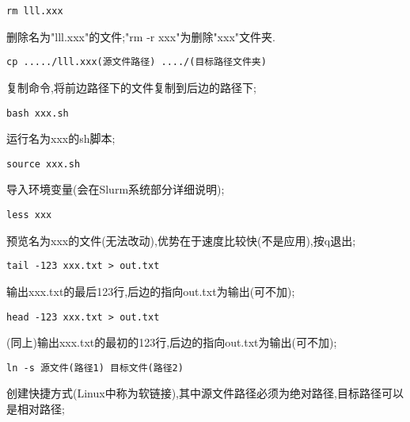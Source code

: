 \begin{lstlisting}[frame=single]
rm lll.xxx
\end{lstlisting}
\par
删除名为"lll.xxx"的文件;"rm -r xxx"为删除"xxx"文件夹.\par

\begin{lstlisting}[frame=single]
cp ...../lll.xxx(源文件路径) ..../(目标路径文件夹)
\end{lstlisting}
\par
复制命令,将前边路径下的文件复制到后边的路径下;\par

\begin{lstlisting}[frame=single]
bash xxx.sh
\end{lstlisting}
\par
运行名为xxx的sh脚本;

\begin{lstlisting}[frame=single]
source xxx.sh
\end{lstlisting}
\par
导入环境变量(会在Slurm系统部分详细说明);\par


\begin{lstlisting}[frame=single]
less xxx
\end{lstlisting}
\par
预览名为xxx的文件(无法改动),优势在于速度比较快(不是应用),按q退出;\par


\begin{lstlisting}[frame=single]
tail -123 xxx.txt > out.txt
\end{lstlisting}
\par
输出xxx.txt的最后123行,后边的指向out.txt为输出(可不加);\par

\begin{lstlisting}[frame=single]
head -123 xxx.txt > out.txt
\end{lstlisting}
\par
(同上)输出xxx.txt的最初的123行,后边的指向out.txt为输出(可不加);\par

\begin{lstlisting}[frame=single]
ln -s 源文件(路径1) 目标文件(路径2)
\end{lstlisting}
\par
创建快捷方式(Linux中称为软链接),其中源文件路径必须为绝对路径,目标路径可以是相对路径;\par

